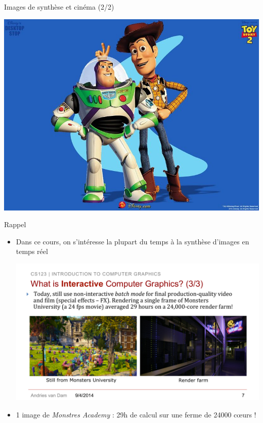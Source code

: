 \begin{frame}{Images de synthèse et cinéma (2/2)}
\begin{center}
\hspace{0.1cm}
\includegraphics[height=0.28\textheight]{figs/ToyStory.jpg}
\end{center}
\end{frame}

\begin{frame}{Rappel}
\begin{itemize}
\item Dans ce cours, on s'intéresse la plupart du temps à la synthèse d'images en temps réel
\begin{center}
\includegraphics[width=.9\textwidth]{figs/monsters.pdf}
\end{center}
\item 1 image de \textit{Monstres Academy} : 29h de calcul sur une ferme de 24000 c\oe urs !
\end{itemize}
\end{frame}

